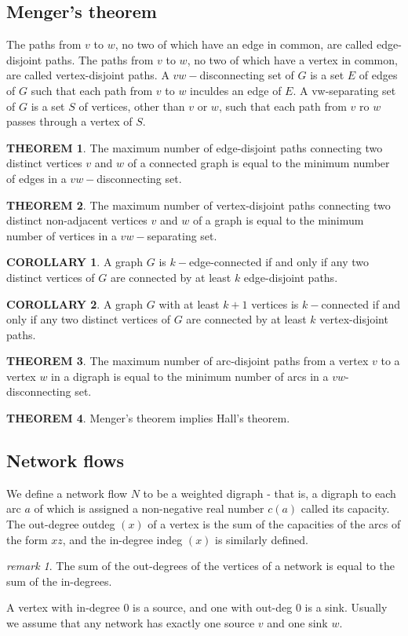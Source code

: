 \documentclass[a4paper,11pt]{article}%
\theoremstyle{remark}
\newtheorem*{remark}{remark}
\theoremstyle{definition}
\newtheorem{theorem}{THEOREM}[section]
\theoremstyle{definition}
\newtheorem{corollary}{COROLLARY}[section]
\theoremstyle{definition}
\theoremstyle{definition}
\theoremstyle{plain}
\theoremstyle{definition}
\begin{document}
\subsection{Menger's theorem}
The paths from $v$ to $w$, no two of which have an edge in common, are called edge-disjoint paths. 
The paths from $v$ to $w$, no two of which have a vertex in common, are called vertex-disjoint paths.
A $vw-$disconnecting set of $G$ is a set $E$ of edges of $G$ such that each path from $v$ to $w$ inculdes an edge of $E$.
A vw-separating set of $G$ is a set $S$ of vertices, other than $v$ or $w$, such that each path from $v$ ro $w$ passes through a vertex of $S$.
\begin{theorem}
    The maximum number of edge-disjoint paths connecting two distinct vertices $v$ and $w$ of a connected graph is equal to the 
    minimum number of edges in a $vw-$disconnecting set.
\end{theorem}
\begin{theorem}
    The maximum number of vertex-disjoint paths connecting two distinct non-adjacent vertices $v$ and $w$ of a graph is equal 
    to the minimum number of vertices in a $vw-$separating set.
\end{theorem}
\begin{corollary}
    A graph $G$ is $k-$edge-connected if and only if any two distinct vertices of $G$ are connected by at least $k$ edge-disjoint paths.
\end{corollary}
\begin{corollary}
    A graph $G$ with at least $k+1$ vertices is $k-$connected if and only if any two distinct vertices of $G$ are connected by at least 
    $k$ vertex-disjoint paths.
\end{corollary}
\begin{theorem}
    The maximum number of arc-disjoint paths from a vertex $v$ to a vertex $w$ in a digraph is equal to the minimum number of arcs in a 
    $vw$-disconnecting set.
\end{theorem}
\begin{theorem}
    Menger's theorem implies Hall's theorem.
\end{theorem}
\subsection{Network flows}
We define a network flow $N$ to be a weighted digraph - that is, a digraph to each arc $a$ of which is assigned a non-negative 
real number $c(a)$ called its capacity. The out-degree outdeg $(x)$ of a vertex is the sum of the capacities of the arcs of the 
form $xz$, and the in-degree indeg $(x)$ is similarly defined. 
\begin{remark}
    The sum of the out-degrees of the vertices of a network is equal to the sum of the in-degrees.
\end{remark}
A vertex with in-degree 0 is a source, and one with out-deg 0 is a sink. Usually we assume that any network has exactly one source $v$ 
and one sink $w$.
\end{document}
